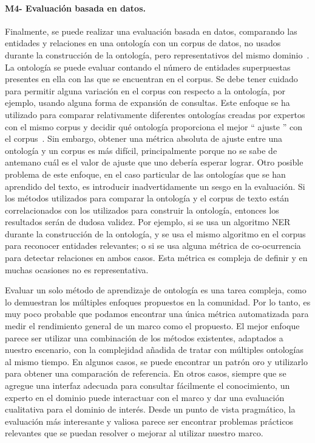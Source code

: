 \paragraph{M4- Evaluación basada en datos.}

Finalmente, se puede realizar una evaluación basada en datos, comparando las entidades y relaciones en una ontología con un corpus de datos, no usados   durante la construcción de la ontología, pero representativos del mismo dominio~\cite{brank2005survey}.
La ontología se puede evaluar contando el número de entidades superpuestas presentes en ella con las que se encuentran en el corpus.
Se debe tener cuidado para permitir alguna variación en el corpus con respecto a la ontología, por ejemplo, usando alguna forma de expansión de consultas.
Este enfoque se ha utilizado para comparar relativamente diferentes ontologías creadas por expertos con el mismo corpus y decidir qué ontología proporciona el mejor `` ajuste '' con el corpus~\cite{brewster2004data}.
Sin embargo, obtener una métrica absoluta de ajuste entre una ontología y un corpus es más difícil, principalmente porque no se sabe de antemano cuál es el valor de ajuste que uno debería esperar lograr.
Otro posible problema de este enfoque, en el caso particular de las ontologías que se han aprendido del texto, es introducir inadvertidamente un sesgo en la evaluación.
Si los métodos utilizados para comparar la ontología y el corpus de texto están correlacionados con los utilizados para construir la ontología, entonces los resultados serán de dudosa validez.
Por ejemplo, si se usa un algoritmo NER durante la construcción de la ontología, y se usa el mismo algoritmo en el corpus para reconocer entidades relevantes; o si se usa alguna métrica de co-ocurrencia para detectar relaciones en ambos casos.
Esta métrica es compleja de definir y en muchas ocasiones no es representativa.

\vspace{1em}

Evaluar un solo método de aprendizaje de ontología es una tarea compleja, como lo demuestran los múltiples enfoques propuestos en la comunidad.
Por lo tanto, es muy poco probable que podamos encontrar una única métrica automatizada para medir el rendimiento general de un marco como el propuesto.
El mejor enfoque parece ser utilizar una combinación de los métodos existentes, adaptados a nuestro escenario, con la complejidad añadida de tratar con múltiples ontologías al mismo tiempo.
En algunos casos, se puede encontrar un patrón oro y utilizarlo para obtener una comparación de referencia.
En otros casos, siempre que se agregue una interfaz adecuada para consultar fácilmente el conocimiento, un experto en el dominio puede interactuar con el marco y dar una evaluación cualitativa para el dominio de interés.
Desde un punto de vista pragmático, la evaluación más interesante y valiosa parece ser encontrar problemas prácticos relevantes que se puedan resolver o mejorar al utilizar nuestro marco.

